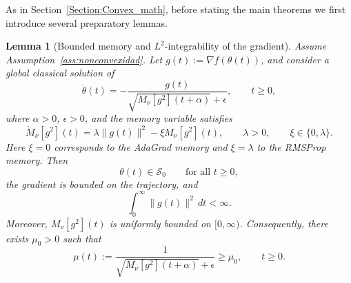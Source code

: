 \documentclass{article} %
\newtheorem{lemma}{Lemma}
\begin{document}
As in Section~\ref{Section:Convex_math}, before stating the main theorems we first introduce several preparatory lemmas. 


\begin{lemma}[Bounded memory and $L^2$-integrability of the gradient]
\label{lem:nonconvex_L2_gradient_memory}
Assume Assumption~\ref{ass:nonconvexidad}. Let $g(t):=\nabla f(\theta(t))$, and consider a global classical solution of
\begin{equation}
\label{eq:nonconvex_adagrad_rmsprop_shifted}
    \dot\theta(t)
    =
    -
    \frac{g(t)}
    {\sqrt{M_\nu[g^2](t+\alpha)}+\epsilon},
    \qquad t\geq0,
\end{equation}
where \(\alpha>0\), \(\epsilon>0\), and the memory variable satisfies
\begin{equation}
\label{eq:memory_ode_nonconvex}
    \dot M_\nu[g^2](t)=\lambda\|g(t)\|^2-\xi M_\nu[g^2](t),
    \qquad
    \lambda>0,
    \qquad
    \xi\in\{0,\lambda\}.
\end{equation}
Here \(\xi=0\) corresponds to the AdaGrad memory and \(\xi=\lambda\) to the RMSProp memory. Then
\[
    \theta(t)\in \mathcal{S}_0
    \qquad\text{for all }t\geq0,
\]
the gradient is bounded on the trajectory, and
\[
    \int_0^\infty \|g(t)\|^2\,dt<\infty.
\]
Moreover, \(M_\nu[g^2](t)\) is uniformly bounded on \([0,\infty)\). Consequently, there exists \(\mu_0>0\) such that
\[
    \mu(t)
    :=
    \frac{1}{\sqrt{M_\nu[g^2](t+\alpha)}+\epsilon}
    \geq \mu_0,
    \qquad t\geq0.
\]
\end{lemma}
\end{document}
